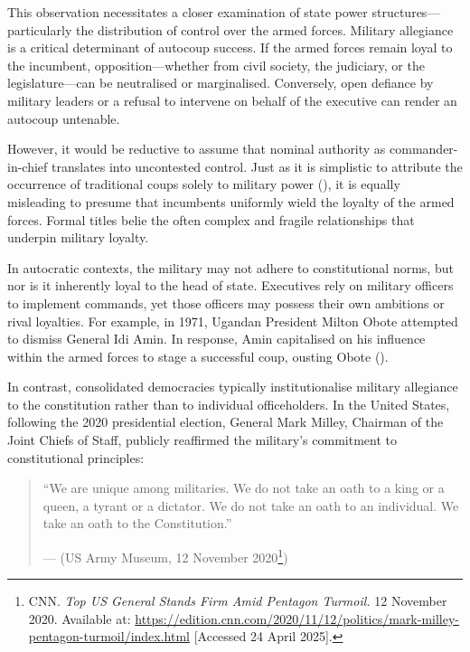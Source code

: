 \documentclass[
  12pt,
]{report}
\begin{document}
This observation necessitates a closer examination of state power
structures---particularly the distribution of control over the armed
forces. Military allegiance is a critical determinant of autocoup
success. If the armed forces remain loyal to the incumbent,
opposition---whether from civil society, the judiciary, or the
legislature---can be neutralised or marginalised. Conversely, open
defiance by military leaders or a refusal to intervene on behalf of the
executive can render an autocoup untenable.

However, it would be reductive to assume that nominal authority as
commander-in-chief translates into uncontested control. Just as it is
simplistic to attribute the occurrence of traditional coups solely to
military power (), it is equally
misleading to presume that incumbents uniformly wield the loyalty of the
armed forces. Formal titles belie the often complex and fragile
relationships that underpin military loyalty.

In autocratic contexts, the military may not adhere to constitutional
norms, but nor is it inherently loyal to the head of state. Executives
rely on military officers to implement commands, yet those officers may
possess their own ambitions or rival loyalties. For example, in 1971,
Ugandan President Milton Obote attempted to dismiss General Idi Amin. In
response, Amin capitalised on his influence within the armed forces to
stage a successful coup, ousting Obote
().

In contrast, consolidated democracies typically institutionalise
military allegiance to the constitution rather than to individual
officeholders. In the United States, following the 2020 presidential
election, General Mark Milley, Chairman of the Joint Chiefs of Staff,
publicly reaffirmed the military's commitment to constitutional
principles:

\begin{quote}
``We are unique among militaries. We do not take an oath to a king or a
queen, a tyrant or a dictator. We do not take an oath to an individual.
We take an oath to the Constitution.''

--- (US Army Museum, 12 November 2020\footnote{CNN. \emph{Top US General
  Stands Firm Amid Pentagon Turmoil.} 12 November 2020. Available at:
  \url{https://edition.cnn.com/2020/11/12/politics/mark-milley-pentagon-turmoil/index.html}
  {[}Accessed 24 April 2025{]}.})
\end{quote}
\end{document}
